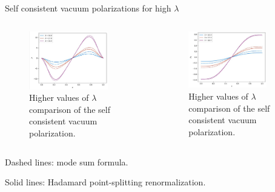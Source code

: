 \begin{frame}{Self consistent vacuum polarizations for high $\lambda$}
	\begin{columns}
	    \begin{column}{0.5\textwidth}
	    \begin{figure}[h]
	    	\centering
	    	\includegraphics[width=0.8\textwidth]{figures/high-lambda-vacuum-polarization.png}
	    	\caption{Higher values of $\lambda$ comparison of the self consistent vacuum polarization.}
	    	\label{fig:figures-}
	    \end{figure}
	    \end{column}
	    \begin{column}{0.5\textwidth}
	    \begin{figure}[h]
	    	\centering
	    	\includegraphics[width=0.8\textwidth]{figures/high-lambda-induced-A0.png}
	    	\caption{Higher values of $\lambda$ comparison of the self consistent vacuum polarization.}
	    	\label{fig:figures-}
	    \end{figure}
	    \end{column}
	\end{columns}
	Dashed lines: mode sum formula. 

	Solid lines: Hadamard point-splitting renormalization.
\end{frame}

